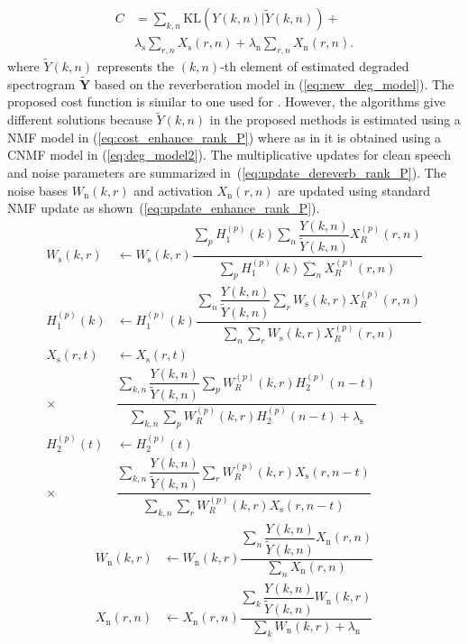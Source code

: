 \begin{align}
C &= \sum_{k,n}\text{KL}(Y(k,n)|\tilde{Y}(k,n)) + \nonumber \\
& \lambda_{\text{s}} \sum_{r,n} X_{\text{s}}(r,n) + \lambda_{\text{n}} \sum_{r,n} X_{\text{n}}(r,n).
\label{eq:cost_enhance_rank_P}
\end{align}
where $\tilde{Y}(k,n)$ represents the $(k,n)$-th element of estimated degraded  spectrogram $\mathbf{\tilde{Y}}$ based on the reverberation model in (\ref{eq:new_deg_model}). The proposed cost function is similar to one used for . However, the algorithms give different solutions because $\tilde{Y}(k, n)$ in the proposed methods is estimated using a NMF model in (\ref{eq:cost_enhance_rank_P}) where as in  it is obtained using a CNMF model in (\ref{eq:deg_model2}).
The multiplicative updates for clean speech and noise parameters are summarized in~(\ref{eq:update_dereverb_rank_P}).
The noise bases $W_{\text{n}}(k,r)$ and activation $X_{\text{n}}(r,n)$ are updated using standard NMF update as shown~(\ref{eq:update_enhance_rank_P}).
\begin{align}
W_{\text{s}}(k,r)&\leftarrow W_{\text{s}}(k,r) \dfrac{\sum_p H_1^{(p)}(k)\sum_n \dfrac{Y(k,n)}{\tilde{Y}(k,n)}X_R^{(p)}(r,n)}{\sum_p H_1^{(p)}(k) \sum_n X_R^{(p)}(r,n)} \nonumber \\
H_1^{(p)}(k) &\leftarrow H_1^{(p)}(k)\dfrac{\sum_n\dfrac{Y(k,n)}{\tilde{Y}(k,n)}\sum_r W_{\text{s}}(k,r)X_R^{(p)}(r,n)}{\sum_n \sum_r W_{\text{s}}(k,r)X_R^{(p)}(r,n)} \nonumber \\
X_{\text{s}}(r,t) &\leftarrow X_{\text{s}}(r,t) \nonumber \\ 
         \times &\dfrac{\sum_{k,n} \dfrac{Y(k,n)}{\tilde{Y}(k,n)}  \sum_p W_R^{(p)}(k,r) H_2^{(p)}(n-t)}{\sum_{k,n}  \sum_p W_R^{(p)}(k,r) H_2^{(p)}(n-t) + \lambda_{\text{s}}} \nonumber \\
H_2^{(p)}(t) &\leftarrow H_2^{(p)}(t) \nonumber\\
\times &\dfrac{\sum_{k,n} \dfrac{Y(k,n)}{\tilde{Y}(k,n)}\sum_r W_R^{(p)}(k,r)X_{\text{s}}(r,n-t)}{\sum_{k,n} \sum_r W_R^{(p)}(k,r)X_{\text{s}}(r,n-t)}
\label{eq:update_dereverb_rank_P}
\end{align}  
\begin{align}
W_{\text{n}}(k,r) & \leftarrow W_{\text{n}}(k,r)\dfrac{\sum_n \dfrac{Y(k,n)}{\tilde{Y}(k,n)}X_{\text{n}}(r,n)}{\sum_n X_{\text{n}}(r,n)} \nonumber \\
X_{\text{n}}(r,n) &\leftarrow X_{\text{n}}(r,n) \dfrac{\sum_k \dfrac{Y(k,n)}{\tilde{Y}(k,n)}W_{\text{n}}(k,r)}{\sum_k W_{\text{n}}(k,r) + \lambda_{\text{n}}}
\label{eq:update_enhance_rank_P}
\end{align}

